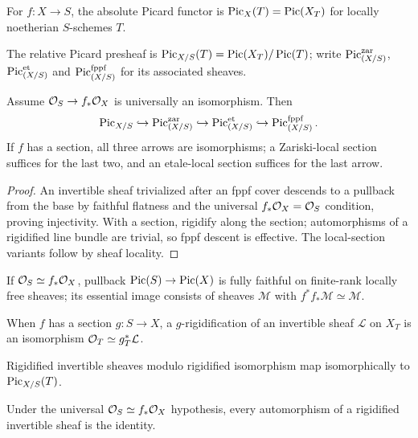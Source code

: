 \begin{definition}\label{fga-def-9-2-1}\uses{}
For $f:X\to S$, the absolute Picard functor is
$\operatorname{Pic}_X(T)=\operatorname{Pic}(X_T)$ for locally noetherian $S$-schemes $T$.
\end{definition}\begin{definition}\label{fga-def-9-2-2}
The relative Picard presheaf is $\operatorname{Pic}_{X/S}(T)=\operatorname{Pic}(X_T)/\operatorname{Pic}(T)$; write
$\operatorname{Pic}_{(X/S)}^{\mathrm{zar}}$, $\operatorname{Pic}_{(X/S)}^{\mathrm{et}}$ and
$\operatorname{Pic}_{(X/S)}^{\mathrm{fppf}}$ for its associated sheaves.
\end{definition}
\begin{theorem}[comparison]\label{fga-thm-9-2-5}
Assume $\mathcal O_S\to f_*\mathcal O_X$ is universally an isomorphism.  Then
\[
\operatorname{Pic}_{X/S}\hookrightarrow\operatorname{Pic}_{(X/S)}^{\mathrm{zar}}
\hookrightarrow\operatorname{Pic}_{(X/S)}^{\mathrm{et}}
\hookrightarrow\operatorname{Pic}_{(X/S)}^{\mathrm{fppf}}.
\]
If $f$ has a section, all three arrows are isomorphisms; a Zariski-local
section suffices for the last two, and an etale-local section suffices for the
last arrow.
\end{theorem}
\begin{proof}
An invertible sheaf trivialized after an fppf cover descends to a pullback from
the base by faithful flatness and the universal $f_*\mathcal O_X=\mathcal O_S$ condition,
proving injectivity.  With a section, rigidify along the section; automorphisms
of a rigidified line bundle are trivial, so fppf descent is effective.  The
local-section variants follow by sheaf locality.
\end{proof}
\begin{lemma}\label{fga-lem-9-2-7}
If $\mathcal O_S\simeq f_*\mathcal O_X$, pullback $\operatorname{Pic}(S)\to\operatorname{Pic}(X)$ is fully faithful on
finite-rank locally free sheaves; its essential image consists of sheaves
$\mathcal M$ with $f^*f_*\mathcal M\simeq\mathcal M$.
\end{lemma}
\begin{definition}[rigidification]\label{fga-def-9-2-8}
When $f$ has a section $g:S\to X$, a $g$-rigidification of an invertible sheaf
$\mathcal L$ on $X_T$ is an isomorphism $\mathcal O_T\simeq g_T^*\mathcal L$.
\end{definition}
\begin{lemma}\label{fga-lem-9-2-9}
Rigidified invertible sheaves modulo rigidified isomorphism map isomorphically
to $\operatorname{Pic}_{X/S}(T)$.
\end{lemma}
\begin{lemma}\label{fga-lem-9-2-10}
Under the universal $\mathcal O_S\simeq f_*\mathcal O_X$ hypothesis, every automorphism of a
rigidified invertible sheaf is the identity.
\end{lemma}

